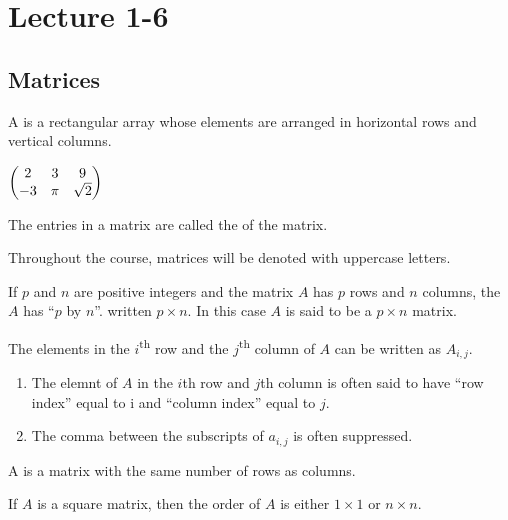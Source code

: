 \section{Lecture 1-6}
\subsection{Matrices}

\begin{definition}
  A  is a rectangular array whose elements are arranged in horizontal rows and vertical columns.
\end{definition}

$\begin{pmatrix}
  \centering
  2 & 3 & 9 \\
  -3 & \pi & \sqrt{2}
\end{pmatrix}$

\begin{remark}
  The entries in a matrix are called the  of the matrix.
\end{remark}

Throughout the course, matrices will be denoted with uppercase letters.

\begin{definition}
  If $p$ and $n$ are positive integers and the matrix $A$ has $p$ rows and $n$ columns, 
  the $A$ has  ``$p$ by $n$''. written $p \times n$. 
  In this case $A$ is said to be a $p \times n$ matrix.
\end{definition}

The elements in the $i$\textsuperscript{th} row and the $j$\textsuperscript{th} column of $A$ 
can be written as $A_{i, j}$.

\begin{remark}
  \begin{enumerate}
    \item The elemnt of $A$ in the $i$th row and $j$th column is often said to have ``row index'' equal to i
      and ``column index'' equal to $j$.
    \item The comma between the subscripts of $a_{i, j}$ is often suppressed.
  \end{enumerate}
\end{remark}

\begin{definition}
  A  is a matrix with the same number of rows as columns.
\end{definition}

If $A$ is a square matrix, then the order of $A$ is either $1 \times 1$ or $n \times n$.

